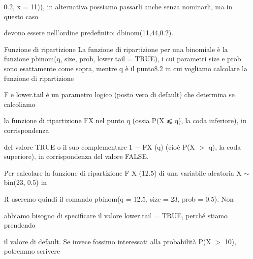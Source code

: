 \documentclass[a4paper,portrait,12pt]{article}
\begin{document}
\begin{flushleft}
0.2, x = 11)), in alternativa possiamo passarli anche senza nominarli, ma in questo caso
\end{flushleft}


\begin{flushleft}
devono essere nell'ordine predefinito: dbinom(11,44,0.2).
\end{flushleft}


\begin{flushleft}
Funzione di ripartizione La funzione di ripartizione per una binomiale \`{e} la funzione pbinom(q, size, prob, lower.tail = TRUE), i cui parametri size e prob sono esattamente come sopra, mentre q \`{e} il punto8.2 in cui vogliamo calcolare la funzione di ripartizione
\end{flushleft}


\begin{flushleft}
F e lower.tail \`{e} un parametro logico (posto vero di default) che determina se calcoliamo
\end{flushleft}


\begin{flushleft}
la funzione di ripartizione FX nel punto q (ossia P(X ⩽ q), la coda inferiore), in corrispondenza
\end{flushleft}


\begin{flushleft}
del valore TRUE o il suo complementare 1 $-$ FX (q) (cio\`{e} P(X $>$ q), la coda superiore), in corrispondenza del valore FALSE.
\end{flushleft}


\begin{flushleft}
Per calcolare la funzione di ripartizione F X (12.5) di una variabile aleatoria X $\sim$ bin(23, 0.5) in
\end{flushleft}


\begin{flushleft}
R useremo quindi il comando pbinom(q = 12.5, size = 23, prob = 0.5). Non
\end{flushleft}


\begin{flushleft}
abbiamo bisogno di specificare il valore lower.tail = TRUE, perch\'{e} stiamo prendendo
\end{flushleft}


\begin{flushleft}
il valore di default. Se invece fossimo interessati alla probabilit\`{a} P(X $>$ 10), potremmo scrivere
\end{flushleft}
\end{document}
